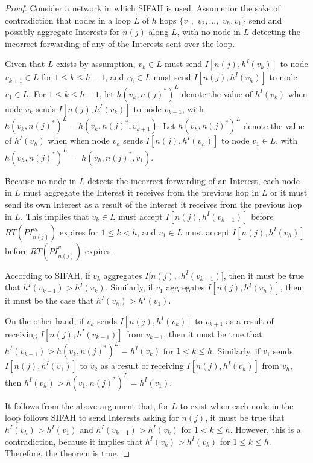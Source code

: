 \documentclass{ancs15-alternate}
\begin{document}
\begin{proof}
Consider a network in which SIFAH is used.  Assume for the sake of contradiction that  nodes in a loop  $L$ of $h$ hops  $\{ v_1 , $ $v_2 , ..., $ $v_h , v_1 \}$  send and possibly aggregate
Interests for $n(j)$ along $L$, with no node in $L$  detecting the incorrect forwarding of any of the Interests sent over the loop.


Given that  $L$ exists by assumption, $v_k \in L$ must send $I[n(j), h^I(v_{k}) ]$ to node $v_{k+1} \in L$ for $1 \leq k \leq h - 1$, and $v_h \in L$ must send $I[n(j), h^I(v_{h}) ]$ to node $v_{1} \in L$. 
For $1 \leq k \leq h - 1$, let $h(v_k, n(j)^*)^L$ denote the value of $h^I (v_k)$ when node 
$v_k$   sends $I[n(j), h^I(v_{k}) ]$  to node $v_{k+1}$,  
with $h(v_k, n(j)^*)^L = h(v_k, n(j)^*, v_{k+1})$. 
Let $h(v_h, n(j)^*)^L$ denote 
the value of $h^I (v_h)$ when when node $v_h$ sends
$I[n(j), h^I(v_{h}) ]$ to node $v_1 \in L$, with $h(v_h, n(j)^*)^L =$  $ h(v_h, n(j)^*, v_1)$. 

Because no node in $L$ detects the incorrect forwarding  of an Interest, each node in $L$ must aggregate the Interest it receives from the previous hop in $L$ or it must send its own Interest as a result of the Interest it receives from the previous hop in $L$. This implies that
$v_k \in L$ must accept $I[n(j), h^I(v_{k-1}) ]$ before $RT(PI^{v_k}_{n(j)})$ expires
for $1 \leq k < h $, and  $v_1 \in L$ must accept $I[n(j), h^I(v_{h}) ]$
before $RT(PI^{v_1}_{n(j)})$ expires.

According to SIFAH, if $v_k$ aggregates $I[n(j),$ $ h^I(v_{k-1}) ]$, then it must be true that $h^I(v_{k-1}) > h^I(v_{k})$. 
Similarly, if $v_1$ aggregates $I[n(j), h^I(v_{h}) ]$, then it must be the case that  $h^I(v_{h}) > h^I(v_{1})$. 

On the other hand, if $v_k$ sends $I[n(j), h^I(v_{k}) ]$ to $v_{k+1}$ as a result of receiving 
$I[n(j), h^I(v_{k-1}) ]$ from $v_{k-1}$, then 
it must be true that  $h^I(v_{k - 1}) > h(v_{k}, n(j)^*)^L = h^I(v_{k}) $ for $1 < k \leq h$.
Similarly, if
$v_1$ sends $I[n(j), h^I(v_{1}) ]$ to $v_{2}$ as a result of receiving 
$I[n(j), h^I(v_{h}) ]$ from  $v_{h}$, then  $h^I(v_{h}) > h(v_{1}, n(j)^*)^L = h^I(v_{1}) $.

It follows from the above argument that, for $L$ to exist when each node in the loop follows SIFAH to send Interests asking for $n(j)$, it must be true that 
$h^I(v_{h}) > h^I(v_{1}) $
and
$h^I(v_{k - 1}) >  h^I(v_{k}) $ for $1 < k \leq h$.
However, this is a contradiction, because it implies that $h^I(v_{k}) >  h^I(v_{k})$ for $1 \leq k \leq h $.
Therefore, the theorem is true.\end{proof}
\end{document}
